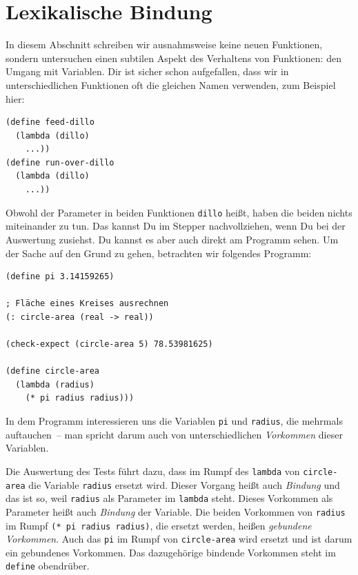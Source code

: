\section{Lexikalische Bindung}
\label{sec:lexikalische-bindung}
\label{sec:lexical-binding}


In diesem Abschnitt schreiben wir ausnahmsweise keine neuen
Funktionen, sondern untersuchen einen subtilen Aspekt des Verhaltens
von Funktionen: den Umgang mit Variablen.  Dir ist sicher schon
aufgefallen, dass wir in unterschiedlichen Funktionen oft die gleichen
Namen verwenden, zum Beispiel hier:
%
\begin{lstlisting}
(define feed-dillo
  (lambda (dillo)
    ...))
(define run-over-dillo
  (lambda (dillo)
    ...))
\end{lstlisting}
%
Obwohl der Parameter in beiden Funktionen \lstinline{dillo} heißt,
haben die beiden nichts miteinander zu tun.
Das kannst Du im Stepper nachvollziehen, wenn Du bei der Auswertung
zusiehst.  Du kannst es aber auch direkt am Programm sehen.  Um der
Sache auf den Grund zu gehen, betrachten wir folgendes Programm:
%
\begin{lstlisting}
(define pi 3.14159265)

; Fläche eines Kreises ausrechnen
(: circle-area (real -> real))

(check-expect (circle-area 5) 78.53981625)

(define circle-area
  (lambda (radius)
    (* pi radius radius)))
\end{lstlisting}
%
In dem Programm interessieren uns die Variablen \lstinline{pi} und
\lstinline{radius}, die mehrmals auftauchen~-- man spricht darum auch
von unterschiedlichen \textit{Vorkommen} dieser
Variablen.

Die Auswertung des Tests führt dazu, dass im Rumpf des
\lstinline{lambda} von \lstinline{circle-area} die Variable
\lstinline{radius} ersetzt wird.  Dieser Vorgang heißt auch
\textit{Bindung} und das ist so, weil
\lstinline{radius} als Parameter im \lstinline{lambda} steht.  Dieses
Vorkommen als Parameter heißt auch \textit{Bindung} der Variable.  Die beiden
Vorkommen von \lstinline{radius} im Rumpf
\lstinline{(* pi radius radius)}, die ersetzt werden,
heißen \textit{gebundene
  Vorkommen}.  Auch das \lstinline{pi} im
Rumpf von \lstinline{circle-area} wird ersetzt und ist darum ein
gebundenes Vorkommen.  Das dazugehörige bindende Vorkommen steht im
\lstinline{define} obendrüber.

